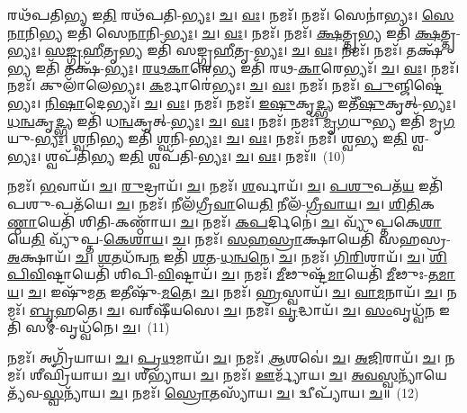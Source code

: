 𑌰𑌥᳴𑌪𑌤𑌿\-\ul{𑌭𑍍𑌯} 𑌇\-\ul{𑌤𑌿} 𑌰𑌥᳴𑌪𑌤𑌿-\-\ul{𑌭𑍍𑌯𑌃}\-। \ul{𑌚}\-। \ul{𑌵𑌃}\-। 𑌨𑌮𑌃᳴। 
𑌨𑌮𑌃᳴। 𑌸𑍇𑌨𑌾॑𑌭𑍍𑌯𑌃। \ul{𑌸𑍇}\-\-\ul{𑌨𑌾}\-𑌨𑌿\-\ul{𑌭𑍍𑌯} 𑌇𑌤𑌿᳴ 𑌸𑍇\-\ul{𑌨𑌾}\-𑌨𑌿-\-\ul{𑌭𑍍𑌯𑌃}\-। \ul{𑌚}\-। \ul{𑌵𑌃}\-। 𑌨𑌮𑌃᳴। 
𑌨𑌮𑌃᳴। \ul{𑌕𑍍𑌷}\-𑌤𑍍𑌤𑍃\-\ul{𑌭𑍍𑌯} 𑌇𑌤𑌿᳴ \ul{𑌕𑍍𑌷}\-𑌤𑍍𑌤𑍃-\-\ul{𑌭𑍍𑌯𑌃}\-। \ul{𑌸}\-\-\ul{𑌙𑍍𑌗𑍍𑌰}\-\-\ul{𑌹𑍀}\-𑌤𑍃\-\ul{𑌭𑍍𑌯} 𑌇𑌤𑌿᳴ 𑌸𑌙𑍍𑌗𑍍𑌰\-\ul{𑌹𑍀}\-𑌤𑍃-\-\ul{𑌭𑍍𑌯𑌃}\-। \ul{𑌚}\-। \ul{𑌵𑌃}\-। 𑌨𑌮𑌃᳴। 
𑌨𑌮𑌃᳴। 𑌤𑌕𑍍𑌷᳴\-\ul{𑌭𑍍𑌯} 𑌇𑌤𑌿᳴ 𑌤𑌕𑍍𑌷᳴-\-\ul{𑌭𑍍𑌯𑌃}\-। \ul{𑌰}\-\-\ul{𑌥}\-\-\ul{𑌕𑌾}\-𑌰𑍇\-\ul{𑌭𑍍𑌯} 𑌇𑌤𑌿᳴ 𑌰𑌥-\-\ul{𑌕𑌾}\-𑌰𑍇𑌭𑍍𑌯𑌃᳴। \ul{𑌚}\-। \ul{𑌵𑌃}\-। 𑌨𑌮𑌃᳴। 
𑌨𑌮𑌃᳴। 𑌕𑍁𑌲𑌾᳴𑌲𑍇𑌭𑍍𑌯𑌃। \ul{𑌕}\-𑌰𑍍𑌮𑌾𑌰𑍇॑𑌭𑍍𑌯𑌃। \ul{𑌚}\-। \ul{𑌵𑌃}\-। 𑌨𑌮𑌃᳴। 
𑌨𑌮𑌃᳴। \ul{𑌪𑍁}\-𑌞𑍍𑌜𑌿𑌷𑍍𑌟𑍇॑𑌭𑍍𑌯𑌃। \ul{𑌨𑌿}\-\-\ul{𑌷𑌾}\-𑌦𑍇𑌭𑍍𑌯𑌃᳴। \ul{𑌚}\-। \ul{𑌵𑌃}\-। 𑌨𑌮𑌃᳴। 
𑌨𑌮𑌃᳴। \ul{𑌇}\-\-\ul{𑌷𑍁}\-𑌕𑍃\-\ul{𑌦𑍍𑌭𑍍𑌯} 𑌇𑌤𑍀᳴\-\ul{𑌷𑍁}\-𑌕𑍃𑌤𑍍-\-\ul{𑌭𑍍𑌯𑌃}\-। \ul{𑌧}\-\-\ul{𑌨𑍍𑌵}\-𑌕𑍃\-\ul{𑌦𑍍𑌭𑍍𑌯} 𑌇𑌤𑌿᳴ 𑌧\-\ul{𑌨𑍍𑌵}\-𑌕𑍃𑌤𑍍-\-\ul{𑌭𑍍𑌯𑌃}\-। \ul{𑌚}\-। \ul{𑌵𑌃}\-। 𑌨𑌮𑌃᳴। 
𑌨𑌮𑌃᳴। \ul{𑌮𑍃}\-\-\ul{𑌗}\-𑌯𑍁\-\ul{𑌭𑍍𑌯} 𑌇𑌤𑌿᳴ 𑌮𑍃\-\ul{𑌗}\-𑌯𑍁-\-\ul{𑌭𑍍𑌯𑌃}\-। \ul{𑌶𑍍𑌵}\-𑌨𑌿\-\ul{𑌭𑍍𑌯} 𑌇𑌤𑌿᳴ \ul{𑌶𑍍𑌵}\-𑌨𑌿-\-\ul{𑌭𑍍𑌯𑌃}\-। \ul{𑌚}\-। \ul{𑌵𑌃}\-। 𑌨𑌮𑌃᳴। 
𑌨𑌮𑌃᳴। 𑌶𑍍𑌵\-\ul{𑌭𑍍𑌯} 𑌇\-\ul{𑌤𑌿} 𑌶𑍍𑌵-\-\ul{𑌭𑍍𑌯𑌃}\-। 𑌶𑍍𑌵𑌪᳴𑌤𑌿\-\ul{𑌭𑍍𑌯} 𑌇\-\ul{𑌤𑌿} 𑌶𑍍𑌵𑌪᳴𑌤𑌿-\-\ul{𑌭𑍍𑌯𑌃}\-। \ul{𑌚}\-। \ul{𑌵𑌃}\-। 𑌨𑌮𑌃᳴॥~(10)


𑌨𑌮𑌃᳴। \ul{𑌭}\-𑌵𑌾𑌯᳴। \ul{𑌚}\-। \ul{𑌰𑍁}\-𑌦𑍍𑌰𑌾𑌯᳴। \ul{𑌚}\-। 
𑌨𑌮𑌃᳴। \ul{𑌶}\-𑌰𑍍𑌵𑌾𑌯᳴। \ul{𑌚}\-। \ul{𑌪}\-\-\ul{𑌶𑍁}\-𑌪𑌤᳴\-\ul{𑌯} 𑌇𑌤𑌿᳴ 𑌪𑌶𑍁-𑌪𑌤᳴𑌯𑍇। \ul{𑌚}\-। 
𑌨𑌮𑌃᳴। 𑌨𑍀𑌲᳴𑌗𑍍𑌰𑍀\-\ul{𑌵𑌾}\-𑌯𑍇\-\ul{𑌤𑌿} 𑌨𑍀𑌲᳴-\-\ul{𑌗𑍍𑌰𑍀}\-\-\ul{𑌵𑌾}\-\-\ul{𑌯}\-। \ul{𑌚}\-। \ul{𑌶𑌿}\-\-\ul{𑌤𑌿}\-𑌕\-\ul{𑌣𑍍𑌠𑌾}\-𑌯𑍇𑌤𑌿᳴ 𑌶𑌿𑌤𑌿-𑌕𑌣𑍍𑌠𑌾᳴𑌯। \ul{𑌚}\-। 
𑌨𑌮𑌃᳴। \ul{𑌕}\-\-\ul{𑌪}\-𑌰𑍍𑌦𑌿𑌨𑍇॑। \ul{𑌚}\-। 𑌵𑍍𑌯𑍁᳴𑌪𑍍𑌤𑌕𑍇\-\ul{𑌶𑌾}\-𑌯𑍇\-\ul{𑌤𑌿} 𑌵𑍍𑌯𑍁᳴𑌪𑍍𑌤-\-\ul{𑌕𑍇}\-\-\ul{𑌶𑌾}\-\-\ul{𑌯}\-। \ul{𑌚}\-। 
𑌨𑌮𑌃᳴। \ul{𑌸}\-\-\ul{𑌹}\-\-\ul{𑌸𑍍𑌰𑌾}\-𑌕𑍍𑌷𑌾𑌯𑍇𑌤𑌿᳴ 𑌸𑌹𑌸𑍍𑌰-\-\ul{𑌅}\-𑌕𑍍𑌷𑌾𑌯᳴। \ul{𑌚}\-। \ul{𑌶}\-\-\ul{𑌤}\-𑌧᳴𑌨𑍍𑌵\-\ul{𑌨} 𑌇𑌤𑌿᳴ \ul{𑌶}\-𑌤-\-\ul{𑌧}\-\-\ul{𑌨𑍍𑌵}\-\-\ul{𑌨𑍇}\-। \ul{𑌚}\-। 
𑌨𑌮𑌃᳴। \ul{𑌗𑌿}\-\-\ul{𑌰𑌿}\-𑌶𑌾𑌯᳴। \ul{𑌚}\-। \ul{𑌶𑌿}\-\-\ul{𑌪𑌿}\-\-\ul{𑌵𑌿}\-𑌷𑍍𑌟𑌾𑌯𑍇𑌤𑌿᳴ 𑌶𑌿𑌪𑌿-\-\ul{𑌵𑌿}\-𑌷𑍍𑌟𑌾𑌯᳴। \ul{𑌚}\-। 
𑌨𑌮𑌃᳴। \ul{𑌮𑍀}\-𑌢𑍁𑌷𑍍𑌟᳴\-\ul{𑌮𑌾}\-𑌯𑍇𑌤𑌿᳴ \ul{𑌮𑍀}\-𑌢𑍁𑌃-\-\ul{𑌤}\-\-\ul{𑌮𑌾}\-\-\ul{𑌯}\-। \ul{𑌚}\-। 𑌇𑌷𑍁᳴𑌮\-\ul{𑌤} 𑌇𑌤𑍀𑌷𑍁᳴-\-\ul{𑌮}\-\-\ul{𑌤𑍇}\-। \ul{𑌚}\-। 
𑌨𑌮𑌃᳴। \ul{𑌹𑍍𑌰}\-𑌸𑍍𑌵𑌾𑌯᳴। \ul{𑌚}\-। \ul{𑌵𑌾}\-\-\ul{𑌮}\-𑌨𑌾𑌯᳴। \ul{𑌚}\-। 
𑌨𑌮𑌃᳴। \ul{𑌬𑍃}\-\-\ul{𑌹}\-𑌤𑍇। \ul{𑌚}\-। 𑌵𑌰𑍍‌𑌷𑍀᳴𑌯𑌸𑍇। \ul{𑌚}\-। 
𑌨𑌮𑌃᳴। \ul{𑌵𑍃}\-𑌦𑍍𑌧𑌾𑌯᳴। \ul{𑌚}\-। \ul{𑌸𑌂}\-𑌵𑍃𑌧𑍍𑌵᳴\-\ul{𑌨} 𑌇𑌤𑌿᳴ 𑌸𑌮𑍍-𑌵𑍃𑌧𑍍𑌵᳴𑌨𑍇। \ul{𑌚}\-।~(11)


𑌨𑌮𑌃᳴। 𑌅𑌗𑍍𑌰𑌿᳴𑌯𑌾𑌯। \ul{𑌚}\-। \ul{𑌪𑍍𑌰}\-\-\ul{𑌥}\-𑌮𑌾𑌯᳴। \ul{𑌚}\-। 
𑌨𑌮𑌃᳴। \ul{𑌆}\-𑌶𑌵𑍇॑। \ul{𑌚}\-। \ul{𑌅}\-\-\ul{𑌜𑌿}\-𑌰𑌾𑌯᳴। \ul{𑌚}\-। 
𑌨𑌮𑌃᳴। 𑌶𑍀𑌘𑍍𑌰𑌿᳴𑌯𑌾𑌯। \ul{𑌚}\-। 𑌶𑍀𑌭𑍍𑌯𑌾᳴𑌯। \ul{𑌚}\-। 
𑌨𑌮𑌃᳴। \ul{𑌊}\-𑌰𑍍𑌮𑍍𑌯𑌾᳴𑌯। \ul{𑌚}\-। \ul{𑌅}\-\-\ul{𑌵}\-\-\ul{𑌸𑍍𑌵}\-𑌨𑍍𑌯𑌾᳴𑌯𑍇𑌤𑍍𑌯᳴𑌵-\-\ul{𑌸𑍍𑌵}\-𑌨𑍍𑌯𑌾᳴𑌯। \ul{𑌚}\-। 
𑌨𑌮𑌃᳴। \ul{𑌸𑍍𑌰𑍋}\-\-\ul{𑌤}\-𑌸𑍍𑌯𑌾᳴𑌯। \ul{𑌚}\-। 𑌦𑍍𑌵𑍀𑌪𑍍𑌯𑌾᳴𑌯। \ul{𑌚}\-॥~(12)


